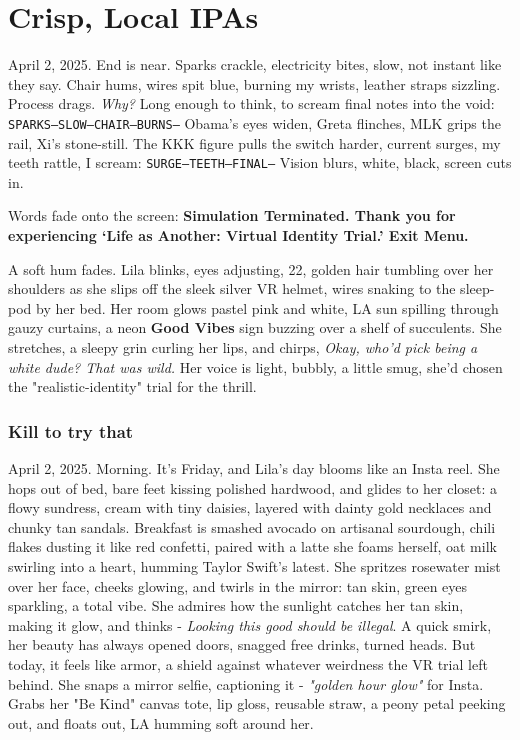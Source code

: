 \documentclass[12pt,oneside]{book} %
\newcommand{\note}[1]{\texttt{#1}}
\begin{document}
\chapter{Crisp, Local IPAs}

April 2, 2025. End is near. Sparks crackle, electricity bites, slow, not instant like they say. Chair hums, wires spit blue, burning my wrists, leather straps sizzling. Process drags. \textit{Why?} Long enough to think, to scream final notes into the void: \note{SPARKS—SLOW—CHAIR—BURNS—} Obama’s eyes widen, Greta flinches, MLK grips the rail, Xi’s stone-still. The KKK figure pulls the switch harder, current surges, my teeth rattle, I scream: \note{SURGE—TEETH—FINAL—} Vision blurs, white, black, screen cuts in.

Words fade onto the screen: \textbf{Simulation Terminated. Thank you for experiencing ‘Life as Another: Virtual Identity Trial.’ Exit Menu.}

A soft hum fades. Lila blinks, eyes adjusting, 22, golden hair tumbling over her shoulders as she slips off the sleek silver VR helmet, wires snaking to the sleep-pod by her bed. Her room glows pastel pink and white, LA sun spilling through gauzy curtains, a neon \textbf{Good Vibes} sign buzzing over a shelf of succulents. She stretches, a sleepy grin curling her lips, and chirps, \textit{Okay, who’d pick being a white dude? That was wild.} Her voice is light, bubbly, a little smug, she’d chosen the "realistic-identity" trial for the thrill.

\subsection*{Kill to try that}

April 2, 2025. Morning. It’s Friday, and Lila’s day blooms like an Insta reel. She hops out of bed, bare feet kissing polished hardwood, and glides to her closet: a flowy sundress, cream with tiny daisies, layered with dainty gold necklaces and chunky tan sandals. Breakfast is smashed avocado on artisanal sourdough, chili flakes dusting it like red confetti, paired with a latte she foams herself, oat milk swirling into a heart, humming Taylor Swift’s latest. She spritzes rosewater mist over her face, cheeks glowing, and twirls in the mirror: tan skin, green eyes sparkling, a total vibe. She admires how the sunlight catches her tan skin, making it glow, and thinks - \textit{Looking this good should be illegal}. A quick smirk, her beauty has always opened doors, snagged free drinks, turned heads. But today, it feels like armor, a shield against whatever weirdness the VR trial left behind. She snaps a mirror selfie, captioning it - \textit{"golden hour glow"} for Insta. Grabs her "Be Kind" canvas tote, lip gloss, reusable straw, a peony petal peeking out, and floats out, LA humming soft around her.
\end{document}
